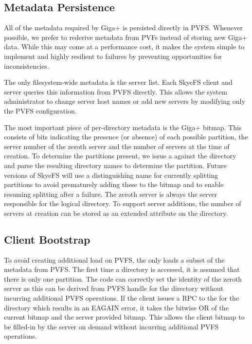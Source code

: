 \documentclass[onecolumn, 11pt, letterpaper]{article}
\begin{document}
\subsection{Metadata Persistence}
All of the metadata required by Giga+ is persisted directly in PVFS.  Whenever
possible, we prefer to rederive metadata from PVFs instead of storing new
Giga+ data.  While this may come at a performance cost, it makes the system
simple to implement and highly resilient to failures by preventing
opportunities for inconsistencies.

The only filesystem-wide metadata is the server list.  Each SkyeFS client and
server queries this information from PVFS directly.  This allows the system
administrator to change server host names or add new servers by modifying only
the PVFS configuration.

The most important piece of per-directory metadata is the Giga+ bitmap.  This
consists of bits indicating the presence (or absence) of each possible
partition, the server number of the zeroth server and  the number of servers
at the time of creation.  To determine the partitions present, we issue a
 against the directory and parse the resulting directory names
to determine the partition.  Future versions of SkyeFS will use a
distinguishing name for currently splitting partitions to avoid prematurely
adding these to the bitmap and to enable resuming splitting after a failure.
The zeroth server is always the server responsible for the logical directory.
To support server additions, the number of servers at creation can be stored
as an extended attribute on the directory.

\subsection{Client Bootstrap}
To avoid creating additional load on PVFS, the  only loads
a subset of the metadata from PVFS.  The first time a directory is accessed,
it is assumed that there is only one partition.  The code can correctly set
the identity of the zeroth server as this can be derived from PVFS handle for
the directory without incurring additional PVFS operations.  If the client
issues a RPC to the  for the directory which results in an
EAGAIN error, it takes the bitwise OR of the current bitmap and the server
provided bitmap.  This allows the client bitmap to be filled-in by the server
on demand without incurring additional PVFS operations.
\end{document}
